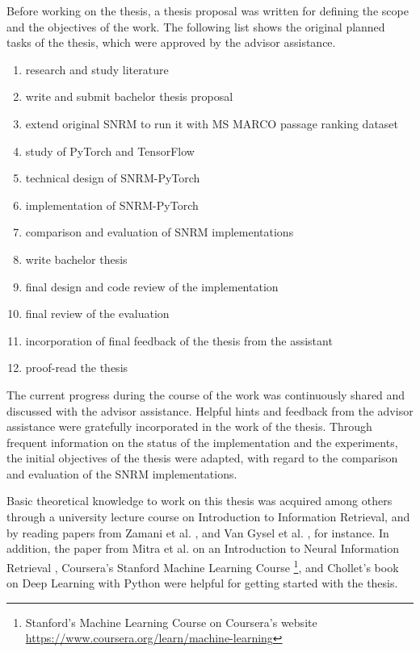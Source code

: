 Before working on the thesis, a thesis proposal was written for
    defining the scope and the objectives of the work.
The following list shows the original planned tasks of the thesis, 
    which were approved by the advisor assistance.
\begin{enumerate}
    \item research and study literature
    \item write and submit bachelor thesis proposal
    \item extend original SNRM to run it with MS MARCO passage ranking dataset
    \item study of PyTorch and TensorFlow
    \item technical design of SNRM-PyTorch
    \item implementation of SNRM-PyTorch
    \item comparison and evaluation of SNRM implementations
    \item write bachelor thesis
    \item final design and code review of the implementation
    \item final review of the evaluation
    \item incorporation of final feedback of the thesis from the assistant
    \item proof-read the thesis
\end{enumerate}
The current progress during the course of the work was continuously
    shared and discussed with the advisor assistance.
Helpful hints and feedback from the advisor assistance were gratefully 
    incorporated in the work of the thesis.
Through frequent information on the status of the implementation 
    and the experiments, the initial objectives of the thesis were adapted, 
    with regard to the comparison and evaluation of the SNRM implementations.

Basic theoretical knowledge to work on this thesis was acquired among others 
    through a university lecture course on Introduction to Information Retrieval,
    and by reading papers
    from Zamani et al. \cite{zamani:2018:from-neural-reranking-to-neural-ranking},
    and Van Gysel et al. \cite{van-gysel:2017:neural-vector-spaces}, for instance.
In addition, the paper from Mitra et al. on 
    an Introduction to Neural Information Retrieval \cite{mitra:2018:introduction-neural-ir},
    Coursera's Stanford Machine Learning Course
    \footnote{Stanford's Machine Learning Course on Coursera's website \url{https://www.coursera.org/learn/machine-learning}},
    and Chollet's book on Deep Learning with Python \cite{chollet:2017:deep-learning-with-python}
    were helpful for getting started with the thesis.
